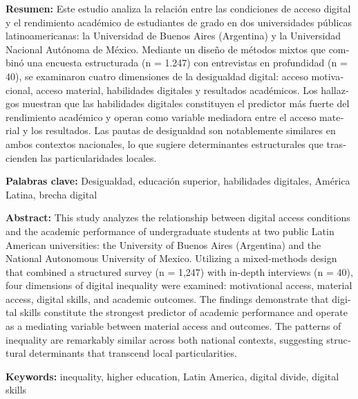\begin{tcolorbox}[colback=brown!8!white,colframe=brown!8!white,boxrule=0pt,arc=2pt,left=4pt,right=4pt,top=3pt,bottom=3pt,before skip=4pt,after skip=4pt]
\begin{otherlanguage}{spanish}
\sffamily\small \textbf{Resumen:} Este estudio analiza la relación entre las condiciones de acceso digital y el rendimiento académico de estudiantes de grado en dos universidades públicas latinoamericanas: la Universidad de Buenos Aires (Argentina) y la Universidad Nacional Autónoma de México. Mediante un diseño de métodos mixtos que combinó una encuesta estructurada (n = 1.247) con entrevistas en profundidad (n = 40), se examinaron cuatro dimensiones de la desigualdad digital: acceso motivacional, acceso material, habilidades digitales y resultados académicos. Los hallazgos muestran que las habilidades digitales constituyen el predictor más fuerte del rendimiento académico y operan como variable mediadora entre el acceso material y los resultados. Las pautas de desigualdad son notablemente similares en ambos contextos nacionales, lo que sugiere determinantes estructurales que trascienden las particularidades locales.

\par\smallskip\noindent\textbf{Palabras clave:} Desigualdad, educación superior, habilidades digitales, América Latina, brecha digital
\end{otherlanguage}
\end{tcolorbox}

\begin{tcolorbox}[colback=brown!8!white,colframe=brown!8!white,boxrule=0pt,arc=2pt,left=4pt,right=4pt,top=3pt,bottom=3pt,before skip=4pt,after skip=4pt]
\begin{otherlanguage}{english}
\sffamily\small \textbf{Abstract:} This study analyzes the relationship between digital access conditions and the academic performance of undergraduate students at two public Latin American universities: the University of Buenos Aires (Argentina) and the National Autonomous University of Mexico. Utilizing a mixed-methods design that combined a structured survey (n = 1,247) with in-depth interviews (n = 40), four dimensions of digital inequality were examined: motivational access, material access, digital skills, and academic outcomes. The findings demonstrate that digital skills constitute the strongest predictor of academic performance and operate as a mediating variable between material access and outcomes. The patterns of inequality are remarkably similar across both national contexts, suggesting structural determinants that transcend local particularities.
\par\smallskip\noindent\textbf{Keywords:} inequality, higher education, Latin America, digital divide, digital skills
\end{otherlanguage}
\end{tcolorbox}

